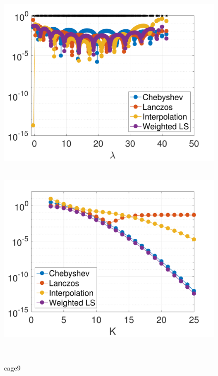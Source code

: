 \documentclass{article}
\begin{document}
\begin{figure}[bth]
\begin{minipage}[m]{0.44\linewidth}
\centerline{~~\includegraphics[width=.95\linewidth]{fig_si2_deg10}}
\end{minipage}
\begin{minipage}[m]{0.44\linewidth}
\centerline{~~\includegraphics[width=.95\linewidth]{fig_si2_err_const_b}}
\end{minipage}\\
\begin{minipage}[m]{0.1\linewidth}
\centerline{\small{cage9}}
\end{minipage}
\begin{minipage}[m]{0.44\linewidth}

\end{minipage}
\end{figure}
\end{document}

